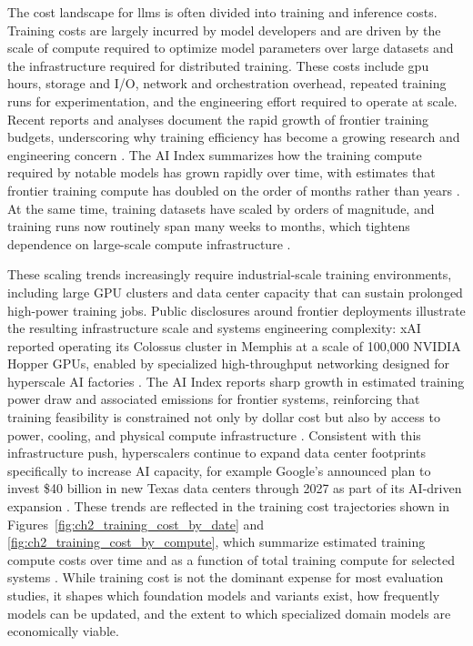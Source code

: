 The cost landscape for \acp{llm} is often divided into training and inference costs. Training costs are largely incurred by model developers and are driven by the scale of compute required to optimize model parameters over large datasets and the infrastructure required for distributed training. These costs include \ac{gpu} hours, storage and I/O, network and orchestration overhead, repeated training runs for experimentation, and the engineering effort required to operate at scale. Recent reports and analyses document the rapid growth of frontier training budgets, underscoring why training efficiency has become a growing research and engineering concern \cite{cottier_RisingCostsTraining_2024, stanforduniversity_ArtificialIntelligenceIndex_2025}. The AI Index summarizes how the training compute required by notable models has grown rapidly over time, with estimates that frontier training compute has doubled on the order of months rather than years \cite{stanforduniversity_ArtificialIntelligenceIndex_2025}. At the same time, training datasets have scaled by orders of magnitude, and training runs now routinely span many weeks to months, which tightens dependence on large-scale compute infrastructure \cite{stanforduniversity_ArtificialIntelligenceIndex_2025}.

These scaling trends increasingly require industrial-scale training environments, including large GPU clusters and data center capacity that can sustain prolonged high-power training jobs. Public disclosures around frontier deployments illustrate the resulting infrastructure scale and systems engineering complexity: xAI reported operating its Colossus cluster in Memphis at a scale of 100{,}000 NVIDIA Hopper GPUs, enabled by specialized high-throughput networking designed for hyperscale AI factories \cite{alexshapiro_NVIDIAEthernetNetworkingAccelerates_2024}. The AI Index reports sharp growth in estimated training power draw and associated emissions for frontier systems, reinforcing that training feasibility is constrained not only by dollar cost but also by access to power, cooling, and physical compute infrastructure \cite{stanforduniversity_ArtificialIntelligenceIndex_2025}. Consistent with this infrastructure push, hyperscalers continue to expand data center footprints specifically to increase AI capacity, for example Google's announced plan to invest \$40 billion in new Texas data centers through 2027 as part of its AI-driven expansion \cite{reuters_GooglePlans40Billion_2025}. These trends are reflected in the training cost trajectories shown in Figures~\ref{fig:ch2_training_cost_by_date} and \ref{fig:ch2_training_cost_by_compute}, which summarize estimated training compute costs over time and as a function of total training compute for selected systems \cite{stanforduniversity_ArtificialIntelligenceIndex_2025}. While training cost is not the dominant expense for most evaluation studies, it shapes which foundation models and variants exist, how frequently models can be updated, and the extent to which specialized domain models are economically viable.


